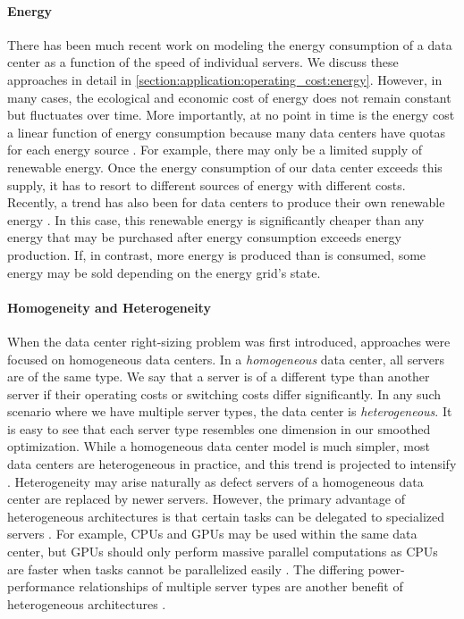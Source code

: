 \paragraph{Energy} There has been much recent work on modeling the energy consumption of a data center as a function of the speed of individual servers. We discuss these approaches in detail in \autoref{section:application:operating_cost:energy}. However, in many cases, the ecological and economic cost of energy does not remain constant but fluctuates over time. More importantly, at no point in time is the energy cost a linear function of energy consumption because many data centers have quotas for each energy source \cite{Miller2021}. For example, there may only be a limited supply of renewable energy. Once the energy consumption of our data center exceeds this supply, it has to resort to different sources of energy with different costs. Recently, a trend has also been for data centers to produce their own renewable energy \cite{Lin2012}. In this case, this renewable energy is significantly cheaper than any energy that may be purchased after energy consumption exceeds energy production. If, in contrast, more energy is produced than is consumed, some energy may be sold depending on the energy grid's state.

\paragraph{Homogeneity and Heterogeneity} When the data center right-sizing problem was first introduced, approaches were focused on homogeneous data centers. In a \emph{homogeneous} data center, all servers are of the same type. We say that a server is of a different type than another server if their operating costs or switching costs differ significantly. In any such scenario where we have multiple server types, the data center is \emph{heterogeneous}. It is easy to see that each server type resembles one dimension in our smoothed optimization. While a homogeneous data center model is much simpler, most data centers are heterogeneous in practice, and this trend is projected to intensify \cite{Jin2016}. Heterogeneity may arise naturally as defect servers of a homogeneous data center are replaced by newer servers. However, the primary advantage of heterogeneous architectures is that certain tasks can be delegated to specialized servers \cite{Jin2016}. For example, CPUs and GPUs may be used within the same data center, but GPUs should only perform massive parallel computations as CPUs are faster when tasks cannot be parallelized easily \cite{Shan2006}. The differing power-performance relationships of multiple server types are another benefit of heterogeneous architectures \cite{Jin2016}.

